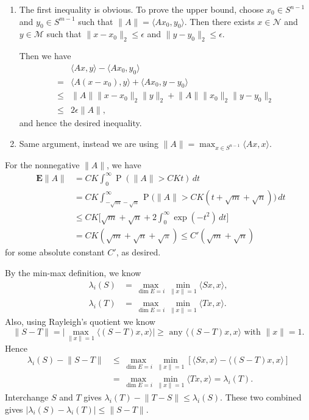 \documentclass[11pt]{article}
\newcommand{\inp}[2]{\langle #1, #2 \rangle}
\newcommand{\nm}[1]{\lVert #1 \rVert}
\newcommand{\abs}[1]{\lvert #1 \rvert}
\renewcommand{\Pr}{\operatorname{P}}
\newcommand{\E}{\mathop{}\!\mathbf{E}}
\theoremstyle{plain}
\theoremstyle{definition}
\theoremstyle{remark}
\theoremstyle{definition}
\newenvironment{mansol}[1]{%
  \renewcommand\themansolinner{#1}%
  \mansolinner
}{\endmansolinner}
\begin{document}
\begin{mansol}{4.4.3}
    \begin{enumerate}[label=(\alph*)]
        \item The first inequality is obvious. To prove the upper bound, choose $x_0 \in S^{n-1}$ and $y_0 \in S^{m-1}$ such that $\nm{A} = \inp{Ax_0}{y_0}$. Then there exists $x\in\mathcal{N}$ and $y \in \mathcal{M}$ such that $\nm{x - x_0}_2 \leq \epsilon$ and $\nm{y - y_0}_2 \leq \epsilon$.

        Then we have \begin{align*}
            & \inp{Ax}{y} - \inp{Ax_0}{y_0} \\
            ={} & \inp{A(x-x_0)}{y} + \inp{Ax_0}{y-y_0} \\
            \leq{} & \nm{A}\nm{x-x_0}_2\nm{y}_2 + \nm{A}\nm{x_0}_2\nm{y-y_0}_2 \\
            \leq{} & 2 \epsilon \nm{A},
        \end{align*}
        and hence the desired inequality.
        \item Same argument, instead we are using $\nm{A} = \max_{x \in S^{n-1}} \inp{Ax}{x}$.
    \end{enumerate}
\end{mansol}

\begin{mansol}{4.4.6}
    For the nonnegative $\nm{A}$, we have \begin{align*}
        \E \nm{A} & = CK \int_0^\infty \Pr(\nm{A} > CKt)\,dt \\
        & = CK \int_{-\sqrt{m}-\sqrt{n}}^\infty \Pr\bigl(\nm{A} > CK(t+ \sqrt{m} + \sqrt{n})\bigr)\,dt \\
        & \leq CK\Big[\sqrt{m} + \sqrt{n} + 2 \int_0^\infty \exp(-t^2)\,dt\Bigr] \\
        & = CK(\sqrt{m}+\sqrt{n} + \sqrt{\pi}) \leq C'(\sqrt{m} + \sqrt{n})
    \end{align*}
    for some absolute constant $C'$, as desired.
\end{mansol}

\begin{mansol}{4.5.3}[Weyl's inequality]
By the min-max definition, we know \begin{align*}
\lambda_i(S) & = \max_{\dim E = i} \min_{\nm{x} = 1} \inp{Sx}{x},\\
\lambda_i(T) & = \max_{\dim E = i} \min_{\nm{x} = 1} \inp{Tx}{x}.
\end{align*}
Also, using Rayleigh's quotient we know \[
\textstyle\nm{S-T} = \big\lvert\max_{\nm{x} = 1}\inp{(S-T)x}{x}\big\rvert \geq \text{ any } \inp{(S-T)x}{x} \text{ with }\nm{x} = 1.
\]
Hence \begin{align*}
\lambda_i(S) - \nm{S-T} & \leq \max_{\dim E = i} \min_{\nm{x} = 1} [\inp{Sx}{x} - \inp{(S-T)x}{x}] \\
& = \max_{\dim E = i} \min_{\nm{x} = 1} \inp{Tx}{x} = \lambda_i(T).
\end{align*}
Interchange $S$ and $T$ gives $\lambda_i(T) - \nm{T - S} \leq \lambda_i(S)$. These two combined gives $\abs{\lambda_i(S) - \lambda_i(T)} \leq \nm{S-T}$.
\end{mansol}
\end{document}
